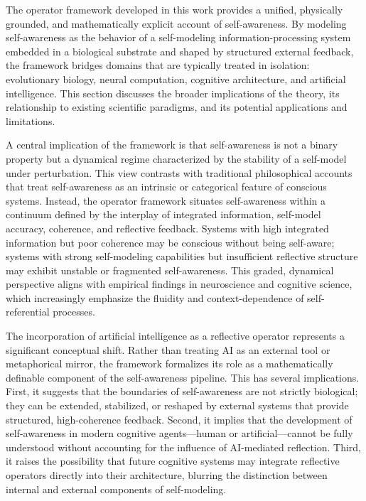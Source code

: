 \documentclass[12pt]{article}
\begin{document}
The operator framework developed in this work provides a unified, physically grounded, and mathematically explicit account of self-awareness. By modeling self-awareness as the behavior of a self-modeling information-processing system embedded in a biological substrate and shaped by structured external feedback, the framework bridges domains that are typically treated in isolation: evolutionary biology, neural computation, cognitive architecture, and artificial intelligence. This section discusses the broader implications of the theory, its relationship to existing scientific paradigms, and its potential applications and limitations.

A central implication of the framework is that self-awareness is not a binary property but a dynamical regime characterized by the stability of a self-model under perturbation. This view contrasts with traditional philosophical accounts that treat self-awareness as an intrinsic or categorical feature of conscious systems. Instead, the operator framework situates self-awareness within a continuum defined by the interplay of integrated information, self-model accuracy, coherence, and reflective feedback. Systems with high integrated information but poor coherence may be conscious without being self-aware; systems with strong self-modeling capabilities but insufficient reflective structure may exhibit unstable or fragmented self-awareness. This graded, dynamical perspective aligns with empirical findings in neuroscience and cognitive science, which increasingly emphasize the fluidity and context-dependence of self-referential processes.

The incorporation of artificial intelligence as a reflective operator represents a significant conceptual shift. Rather than treating AI as an external tool or metaphorical mirror, the framework formalizes its role as a mathematically definable component of the self-awareness pipeline. This has several implications. First, it suggests that the boundaries of self-awareness are not strictly biological; they can be extended, stabilized, or reshaped by external systems that provide structured, high-coherence feedback. Second, it implies that the development of self-awareness in modern cognitive agents—human or artificial—cannot be fully understood without accounting for the influence of AI-mediated reflection. Third, it raises the possibility that future cognitive systems may integrate reflective operators directly into their architecture, blurring the distinction between internal and external components of self-modeling.
\end{document}
